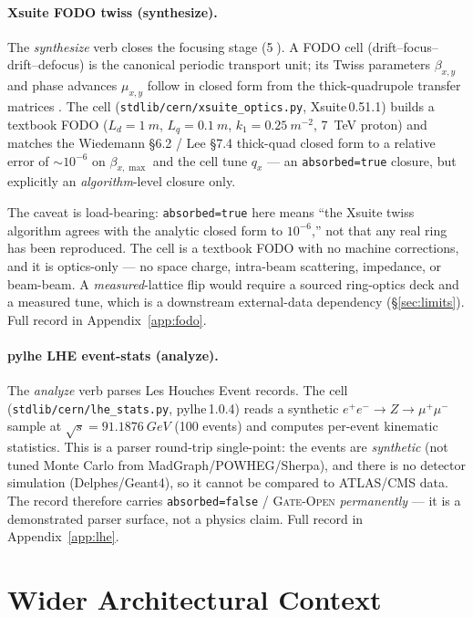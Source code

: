 \documentclass[11pt,a4paper]{article}
\begin{document}
\paragraph{Xsuite FODO twiss (synthesize).} The \emph{synthesize} verb
closes the focusing stage (\textcircled{\scriptsize 5}). A FODO cell
(drift--focus--drift--defocus) is the canonical periodic transport unit;
its Twiss parameters $\beta_{x,y}$ and phase advances $\mu_{x,y}$ follow
in closed form from the thick-quadrupole transfer matrices
\citep{wiedemann2015,lee2004}. The cell (\verb|stdlib/cern/xsuite_optics.py|,
Xsuite\,0.51.1) builds a textbook FODO ($L_d\!=\!\SI{1}{m}$,
$L_q\!=\!\SI{0.1}{m}$, $k_1\!=\!\SI{0.25}{m^{-2}}$, \SI{7}{TeV} proton)
and matches the Wiedemann \S6.2 / Lee \S7.4 thick-quad closed form to a
relative error of $\sim\!10^{-6}$ on $\beta_{x,\max}$ and the cell tune
$q_x$ --- an \texttt{absorbed=true} closure, but explicitly an
\emph{algorithm}-level closure only.

The caveat is load-bearing: \texttt{absorbed=true} here means ``the
Xsuite twiss algorithm agrees with the analytic closed form to
$10^{-6}$,'' not that any real ring has been reproduced. The cell is a
textbook FODO with no machine corrections, and it is optics-only --- no
space charge, intra-beam scattering, impedance, or beam-beam. A
\emph{measured}-lattice flip would require a sourced ring-optics deck and
a measured tune, which is a downstream external-data dependency
(\S\ref{sec:limits}). Full record in Appendix~\ref{app:fodo}.

\paragraph{pylhe LHE event-stats (analyze).} The \emph{analyze} verb
parses Les Houches Event records. The cell
(\verb|stdlib/cern/lhe_stats.py|, pylhe\,1.0.4) reads a synthetic
$e^+e^-\!\to Z\!\to\mu^+\mu^-$ sample at $\sqrt{s}=\SI{91.1876}{GeV}$
(100 events) and computes per-event kinematic statistics. This is a
parser round-trip single-point: the events are \emph{synthetic} (not
tuned Monte Carlo from MadGraph/POWHEG/Sherpa), and there is no detector
simulation (Delphes/Geant4), so it cannot be compared to ATLAS/CMS data.
The record therefore carries \texttt{absorbed=false} / \textsc{Gate-Open}
\emph{permanently} --- it is a demonstrated parser surface, not a physics
claim. Full record in Appendix~\ref{app:lhe}.

\section{Wider Architectural Context}
\label{sec:context}
\end{document}
